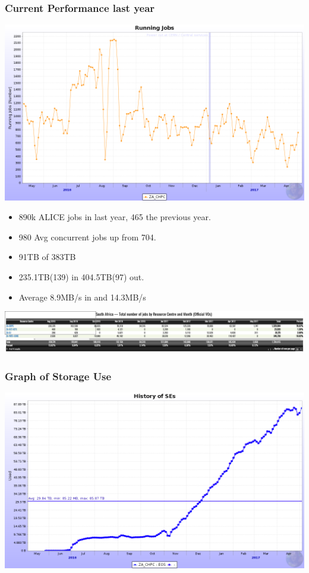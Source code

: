 \documentclass{beamer}
\begin{document}
\begin{frame}
  \frametitle{Current Performance last year}
    \includegraphics[scale=0.15]{ALICERunning1Year.png}
\begin{itemize}
  \item 890k ALICE jobs in last year, 465 the previous year.
  \item 980 Avg concurrent jobs up from 704.
  \item 91TB of 383TB 
  \item 235.1TB(139) in 404.5TB(97) out.
  \item Average 8.9MB/s in and 14.3MB/s
\end{itemize}
\includegraphics[scale=0.25]{NGIAccounting-ShowingAugustPeak.jpg}
\end{frame}

\begin{frame}
    \frametitle{Graph of Storage Use}
    \includegraphics[scale=0.25]{CHPCEOSUsage.png}
\end{frame}
\end{document}

